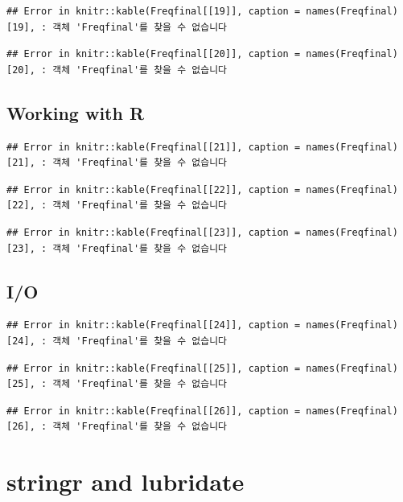 \documentclass[10pt,]{krantz}
\begin{document}
\begin{verbatim}
## Error in knitr::kable(Freqfinal[[19]], caption = names(Freqfinal)[19], : 객체 'Freqfinal'를 찾을 수 없습니다
\end{verbatim}

\begin{verbatim}
## Error in knitr::kable(Freqfinal[[20]], caption = names(Freqfinal)[20], : 객체 'Freqfinal'를 찾을 수 없습니다
\end{verbatim}

\section{Working with R}\label{working-with-r}

\begin{verbatim}
## Error in knitr::kable(Freqfinal[[21]], caption = names(Freqfinal)[21], : 객체 'Freqfinal'를 찾을 수 없습니다
\end{verbatim}

\begin{verbatim}
## Error in knitr::kable(Freqfinal[[22]], caption = names(Freqfinal)[22], : 객체 'Freqfinal'를 찾을 수 없습니다
\end{verbatim}

\begin{verbatim}
## Error in knitr::kable(Freqfinal[[23]], caption = names(Freqfinal)[23], : 객체 'Freqfinal'를 찾을 수 없습니다
\end{verbatim}

\section{I/O}\label{io}

\begin{verbatim}
## Error in knitr::kable(Freqfinal[[24]], caption = names(Freqfinal)[24], : 객체 'Freqfinal'를 찾을 수 없습니다
\end{verbatim}

\begin{verbatim}
## Error in knitr::kable(Freqfinal[[25]], caption = names(Freqfinal)[25], : 객체 'Freqfinal'를 찾을 수 없습니다
\end{verbatim}

\begin{verbatim}
## Error in knitr::kable(Freqfinal[[26]], caption = names(Freqfinal)[26], : 객체 'Freqfinal'를 찾을 수 없습니다
\end{verbatim}

\chapter{stringr and lubridate}\label{stringr-and-lubridate}
\end{document}
